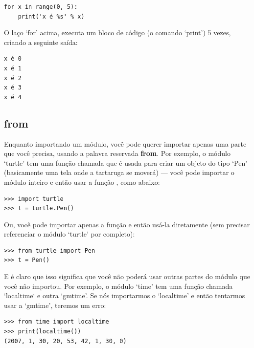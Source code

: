 \begin{listing}
\begin{verbatim}
for x in range(0, 5):
    print('x é %s' % x)
\end{verbatim}
\end{listing}

\noindent
O laço `for' acima, executa um bloco de código (o comando `print') 5 vezes, criando a seguinte saída:

\begin{listing}
\begin{verbatim}
x é 0
x é 1
x é 2
x é 3
x é 4
\end{verbatim}
\end{listing}

\subsection*{from}

Enquanto importando um módulo, você pode querer importar apenas uma parte que você precisa, usando a palavra reservada \textbf{from}. Por exemplo, o módulo `turtle' tem uma função chamada  que é usada para criar um objeto do tipo `Pen' (basicamente uma tela onde a tartaruga se moverá) --- você pode importar o módulo inteiro e então usar a função , como abaixo:

\begin{listingignore}
\begin{verbatim}
>>> import turtle
>>> t = turtle.Pen()
\end{verbatim}
\end{listingignore}

Ou, você pode importar apenas a função  e então usá-la diretamente (sem precisar referenciar o módulo `turtle' por completo):

\begin{listingignore}
\begin{verbatim}
>>> from turtle import Pen
>>> t = Pen()
\end{verbatim}
\end{listingignore}

E é claro que isso significa que você não poderá usar outras partes do módulo que você não importou. Por exemplo, o módulo `time' tem uma função chamada `localtime` e outra `gmtime'. Se nós importarmos o `localtime' e então tentarmos usar a `gmtime', teremos um erro:

\begin{listingignore}
\begin{verbatim}
>>> from time import localtime
>>> print(localtime())
(2007, 1, 30, 20, 53, 42, 1, 30, 0)
\end{verbatim}
\end{listingignore}

